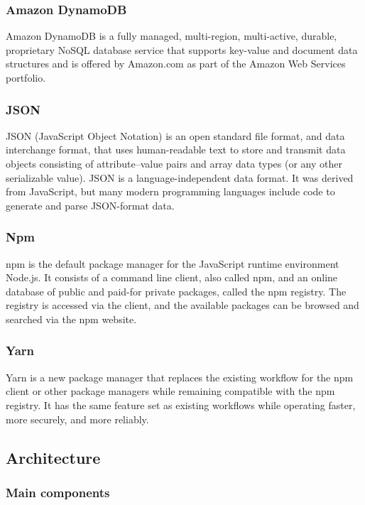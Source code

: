 \subsubsection{Amazon DynamoDB}
Amazon DynamoDB is a fully managed, multi-region, multi-active, durable, proprietary NoSQL database service that supports key-value
and document data structures and is offered by Amazon.com as part of the Amazon Web Services
portfolio.
\subsubsection{JSON}
JSON (JavaScript Object Notation) is an open standard file format, and data interchange format, that
uses human-readable text to store and transmit data objects consisting of attribute–value pairs and
array data types (or any other serializable value).
JSON is a language-independent data format. It was derived from JavaScript,
but many modern programming languages include code to generate and parse JSON-format data.
\subsubsection{Npm}
npm is the default package manager for the JavaScript runtime environment Node.js.
It consists of a command line client, also called npm, and an online database of public and paid-for private packages,
called the npm registry. The registry is accessed via the client, and the available packages can be browsed and
searched via the npm website.
\subsubsection{Yarn}
Yarn is a new package manager that replaces the existing workflow for the npm client or other package managers while
remaining compatible with the npm registry. It has the same feature set as existing workflows while operating faster,
more securely, and more reliably.
\subsection{Architecture}
\subsubsection{Main components}
